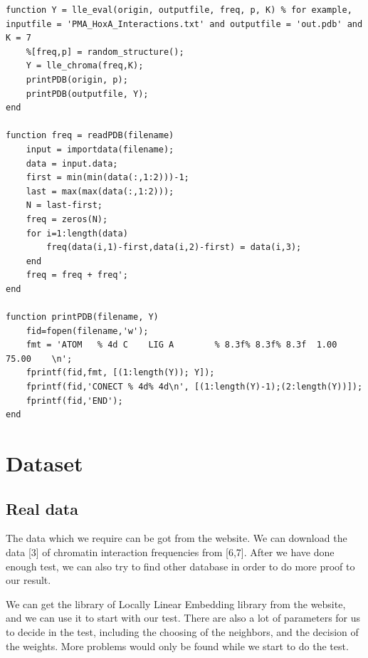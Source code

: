 \documentclass[12pt]{article} %
\begin{document}
\begin{lstlisting}
function Y = lle_eval(origin, outputfile, freq, p, K) % for example, inputfile = 'PMA_HoxA_Interactions.txt' and outputfile = 'out.pdb' and K = 7
    %[freq,p] = random_structure();
    Y = lle_chroma(freq,K);
    printPDB(origin, p);
    printPDB(outputfile, Y);
end

function freq = readPDB(filename)
    input = importdata(filename);
    data = input.data;
    first = min(min(data(:,1:2)))-1;
    last = max(max(data(:,1:2)));
    N = last-first;
    freq = zeros(N);
    for i=1:length(data)
        freq(data(i,1)-first,data(i,2)-first) = data(i,3);
    end
    freq = freq + freq';
end

function printPDB(filename, Y)
    fid=fopen(filename,'w');
    fmt = 'ATOM   % 4d C    LIG A        % 8.3f% 8.3f% 8.3f  1.00 75.00    \n';
    fprintf(fid,fmt, [(1:length(Y)); Y]);
    fprintf(fid,'CONECT % 4d% 4d\n', [(1:length(Y)-1);(2:length(Y))]);
	fprintf(fid,'END');
end
\end{lstlisting}


\section{Dataset} %


\subsection{Real data}

The data which we require can be got from the website. We can download the data [3] of chromatin interaction frequencies from [6,7]. After we have done enough test, we can also try to find other database in order to do more proof to our result.

We can get the library of Locally Linear Embedding library from the website, and we can use it to start with our test. There are also a lot of parameters for us to decide in the test, including the choosing of the neighbors, and the decision of the weights. More problems would only be found while we start to do the test.

\end{document}
